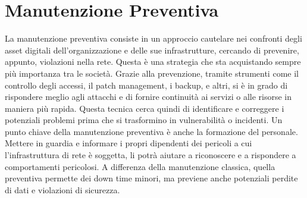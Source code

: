 \section{Manutenzione Preventiva}
    La manutenzione preventiva consiste in un approccio cautelare nei confronti degli asset digitali dell'organizzazione e delle sue infrastrutture, cercando di prevenire, appunto, violazioni nella rete. Questa è una strategia che sta acquistando sempre più importanza tra le società. Grazie alla prevenzione, tramite strumenti come il controllo degli accessi, il patch management, i backup, e altri, si è in grado di rispondere meglio agli attacchi e di fornire continuità ai servizi o alle risorse in maniera più rapida. Questa tecnica cerca quindi di identificare e correggere i potenziali problemi prima che si trasformino in vulnerabilità o incidenti. Un punto chiave della manutenzione preventiva è anche la formazione del personale. Mettere in guardia e informare i propri dipendenti dei pericoli a cui l'infrastruttura di rete è soggetta, li potrà aiutare a riconoscere e a rispondere a comportamenti pericolosi. A differenza della manutenzione classica, quella preventiva permette dei down time minori, ma previene anche potenziali perdite di dati e violazioni di sicurezza.

